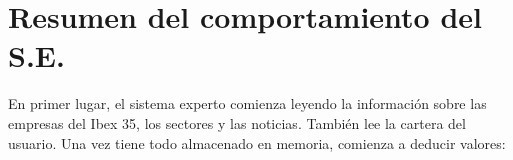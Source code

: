 \documentclass[11pt,openany]{book} %
\begin{document}




\pagestyle{empty} %

\tableofcontents %


\pagestyle{fancy} %





\chapter{Resumen del comportamiento del S.E.}

En primer lugar, el sistema experto comienza leyendo la información sobre las empresas del Ibex 35, los sectores y las noticias. También lee la cartera del usuario. Una vez tiene todo almacenado en memoria, comienza a deducir valores:
\end{document}
